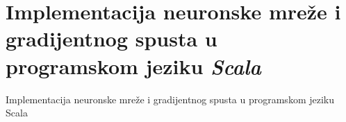\chapter{Implementacija neuronske mreže i gradijentnog spusta u programskom jeziku \emph{Scala}}
\label{ch:implementacija-neuronske-mreze-i-gradijentnog-spusta-u-programskom-jeziku-scala}
Implementacija neuronske mreže i gradijentnog spusta u programskom jeziku Scala %

